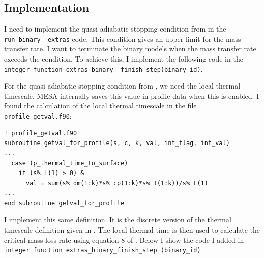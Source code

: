 \documentclass[a4paper,10pt]{article}
\begin{document}
\subsection{Implementation}
I need to implement the quasi-adiabatic stopping condition from \citet{temmink2022} in the \lstinline[style=output, breaklines=true]|run_binary_ extras| code. This condition gives an upper limit for the mass transfer rate. I want to terminate the binary models when the mass transfer rate exceeds the condition. To achieve this, I implement the following code in the \lstinline[style=output, breaklines=true]|integer function extras_binary_ finish_step(binary_id)|.

For the quasi-adiabatic stopping condition from \citet{temmink2022}, we need the local thermal timescale. MESA internally saves this value in profile data when this is enabled. I found the calculation of the local thermal timescale in the file \lstinline[style=output, breaklines=true]|profile_getval.f90|:
\begin{verbatim}
! profile_getval.f90
subroutine getval_for_profile(s, c, k, val, int_flag, int_val)
...
  case (p_thermal_time_to_surface)
    if (s% L(1) > 0) &
      val = sum(s% dm(1:k)*s% cp(1:k)*s% T(1:k))/s% L(1)
...
end subroutine getval_for_profile
\end{verbatim}
I implement this same definition. It is the discrete version of the thermal timescale definition given in \citet{temmink2022}.
The local thermal time is then used to calculate the critical mass loss rate using equation 8 of \citet{temmink2022}.
Below I show the code I added in \lstinline[style=output, breaklines=true]|integer function extras_binary_finish_step (binary_id)|
\end{document}
